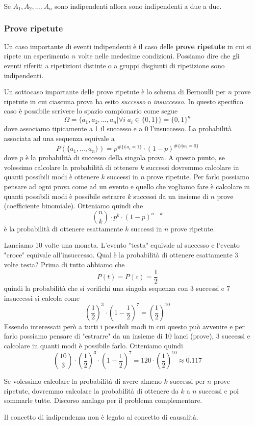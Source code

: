 \begin{observation}
	Se $A_1, A_2, \dots, A_n$ sono indipendenti allora sono indipendenti a due a due.
\end{observation}

\subsubsection{Prove ripetute}
Un caso importante di eventi indipendenti è il caso delle \textbf{prove ripetute} in cui si ripete
un esperimento $n$ volte nelle medesime condizioni. Possiamo dire che gli eventi riferiti a
ripetizioni distinte o a gruppi disgiunti di ripetizione sono indipendenti.

Un sottocaso importante delle prove ripetute è lo schema di Bernoulli per $n$ prove ripetute in
cui ciascuna prova ha esito \emph{successo} o \emph{insuccesso}. In questo specifico caso è
possibile scrivere lo spazio campionario come segue
\[ \Omega = \{ a_1, a_2, \dots, a_n | \forall i \; a_i \in \{ 0, 1 \} \} = \{ 0, 1 \}^n \]
dove associamo tipicamente a 1 il successo e a 0 l'insuccesso. La probabilità associata ad una
sequenza equivale a
\[ P(\{ a_1, \dots, a_n \}) = p^{\# \{i | a_i = 1\}} \cdot (1 - p)^{\# \{i | a_i = 0\}} \]
dove $p$ è la probabilità di successo della singola prova. A questo punto, se volessimo calcolare
la probabilità di ottenere $k$ successi dovremmo calcolare in quanti possibili modi è ottenere $k$
successi in $n$ prove ripetute. Per farlo possiamo pensare ad ogni prova come ad un evento e quello
che vogliamo fare è calcolare in quanti possibili modi è possibile estrarre $k$ successi da un
insieme di $n$ prove (coefficiente binomiale). Otteniamo quindi che
\[ \binom{n}{k} \cdot p^k \cdot (1 - p)^{n - k} \]
è la probabilità di ottenere esattamente $k$ successi in $n$ prove ripetute.

\begin{example}
	Lanciamo 10 volte una moneta. L'evento "testa" equivale al successo e l'evento "croce" equivale
	all'insuccesso. Qual è la probabilità di ottenere esattamente 3 volte testa? Prima di tutto
	abbiamo che
	\[ P(t) = P(c) = \frac{1}{2} \]
	quindi la probabilità che si verifichi una singola sequenza con 3 successi e 7 insuccessi si
	calcola come
	\[
		\left( \frac{1}{2} \right)^3 \cdot \left( 1 - \frac{1}{2} \right)^7
		= \left( \frac{1}{2} \right)^{10}
	\]
	Essendo interessati però a tutti i possibili modi in cui questo può avvenire e per farlo
	possiamo pensare di "estrarre" da un insieme di 10 lanci (prove), 3 successi e calcolare in
	quanti modi è possibile farlo. Otteniamo quindi
	\[
		\binom{10}{3} \cdot \left( \frac{1}{2} \right)^3 \cdot \left( 1 - \frac{1}{2} \right)^7
		= 120 \cdot \left( \frac{1}{2} \right)^{10} \approx 0.117
	\]
\end{example}

Se volessimo calcolare la probabilità di avere almeno $k$ successi per $n$ prove ripetute, dovremmo
calcolare la probabilità di ottenere da $k$ a $n$ successi e poi sommarle tutte. Discorso analago
per il problema complementare.

\begin{observation}
	Il concetto di indipendenza non è legato al concetto di causalità.
\end{observation}
